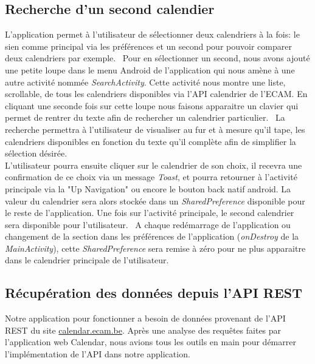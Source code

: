 \documentclass{article}
\begin{document}
	\subsection{Recherche d'un second calendier}
		L'application permet à l'utilisateur de sélectionner deux calendriers à la fois: le sien
        comme principal via les préférences et
		un second pour pouvoir comparer deux calendriers par exemple.  \
        Pour en sélectionner un second, nous avons ajouté une petite loupe dans le menu Android de l'application qui nous amène à une autre
        activité nommée \textit{SearchActivity}. Cette activité nous montre une liste, scrollable,
        de tous les calendriers disponibles via l'API calendrier de l'ECAM.
		En cliquant une seconde fois sur cette loupe nous faisons apparaitre un clavier qui permet de rentrer du texte afin de rechercher
		un calendrier particulier. \
		La recherche permettra à l'utilisateur de visualiser au fur et à mesure qu'il tape, les calendriers disponibles en fonction du
		texte qu'il complète afin de simplifier la sélection désirée. \\
		L'utilisateur pourra ensuite cliquer  sur le calendrier de son choix, il recevra une
        confirmation de ce choix via un message \textit{Toast},
		et pourra retourner à l'activité principale via la "Up Navigation" ou encore le bouton back natif android. La valeur du calendrier
        sera alors stockée dans un \textit{SharedPreference} disponible pour le reste de l'application.
		Une fois sur l'activité principale, le second calendrier sera disponible pour l'utilisateur. \
		A chaque redémarrage de l'application ou changement de la section dans les préférences de
        l'application (\textit{onDestroy} de la \textit{MainActivity}),
        cette \textit{SharedPreference} sera remise à zéro pour ne plus apparaitre dans le calendrier principale de l'utilisateur.


        \subsection{Récupération des données depuis l'API REST}
            Notre application pour fonctionner a besoin de données provenant de l'API REST du site
            \url{calendar.ecam.be}. Après une analyse des requêtes faites par l'application web
            Calendar, nous avions tous les outils en main pour démarrer l'implémentation de l'API
            dans notre application.
\end{document}

